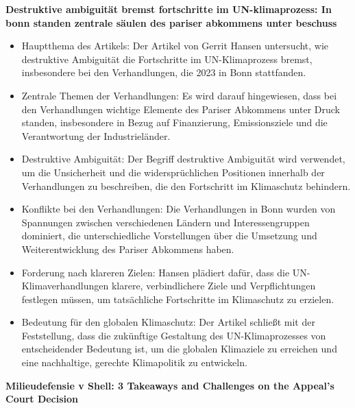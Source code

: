 \documentclass[a4paper, 12pt]{article} %
\begin{document}
 \textbf{\cite{Hansen2023Destruktive} Destruktive ambiguität bremst fortschritte im UN-klimaprozess: In bonn standen zentrale säulen des pariser abkommens unter beschuss}

 \begin{itemize}
   \item Hauptthema des Artikels: Der Artikel von Gerrit Hansen untersucht, wie destruktive Ambiguität die Fortschritte im UN-Klimaprozess bremst, insbesondere bei den Verhandlungen, die 2023 in Bonn stattfanden.
   \item Zentrale Themen der Verhandlungen: Es wird darauf hingewiesen, dass bei den Verhandlungen wichtige Elemente des Pariser Abkommens unter Druck standen, insbesondere in Bezug auf Finanzierung, Emissionsziele und die Verantwortung der Industrieländer.
   \item Destruktive Ambiguität: Der Begriff \glqq{}destruktive Ambiguität\grqq{} wird verwendet, um die Unsicherheit und die widersprüchlichen Positionen innerhalb der Verhandlungen zu beschreiben, die den Fortschritt im Klimaschutz behindern.
   \item Konflikte bei den Verhandlungen: Die Verhandlungen in Bonn wurden von Spannungen zwischen verschiedenen Ländern und Interessengruppen dominiert, die unterschiedliche Vorstellungen über die Umsetzung und Weiterentwicklung des Pariser Abkommens haben.
   \item Forderung nach klareren Zielen: Hansen plädiert dafür, dass die UN-Klimaverhandlungen klarere, verbindlichere Ziele und Verpflichtungen festlegen müssen, um tatsächliche Fortschritte im Klimaschutz zu erzielen.
   \item Bedeutung für den globalen Klimaschutz: Der Artikel schließt mit der Feststellung, dass die zukünftige Gestaltung des UN-Klimaprozesses von entscheidender Bedeutung ist, um die globalen Klimaziele zu erreichen und eine nachhaltige, gerechte Klimapolitik zu entwickeln.
 \end{itemize}

 \textbf{\cite{hesselman2024milieudefensie} Milieudefensie v Shell: 3 Takeaways and Challenges on the Appeal’s Court Decision}
\end{document}
